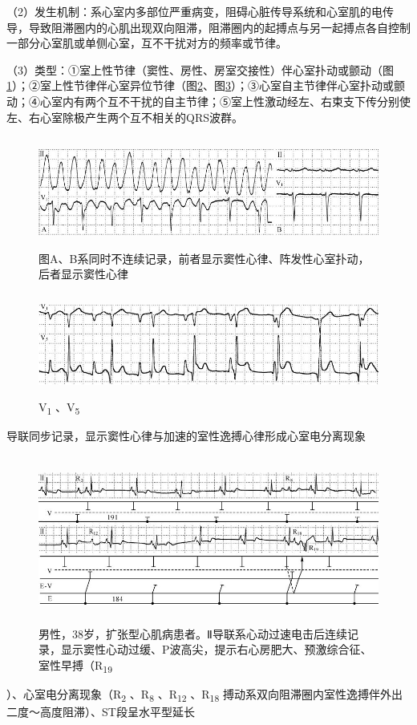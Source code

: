 （2）发生机制：系心室内多部位严重病变，阻碍心脏传导系统和心室肌的电传导，导致阻滞圈内的心肌出现双向阻滞，阻滞圈内的起搏点与另一起搏点各自控制一部分心室肌或单侧心室，互不干扰对方的频率或节律。

（3）类型：①室上性节律（窦性、房性、房室交接性）伴心室扑动或颤动（图\ref{fig30-5}）；②室上性节律伴心室异位节律（图\ref{fig30-6}、图\ref{fig30-7}）；③心室自主节律伴心室扑动或颤动；④心室内有两个互不干扰的自主节律；⑤室上性激动经左、右束支下传分别使左、右心室除极产生两个互不相关的QRS波群。

\begin{figure}[!htbp]
 \centering
 \includegraphics[width=5.60417in,height=1.4375in]{./images/Image00500.jpg}
 \captionsetup{justification=centering}
 \caption{图A、B系同时不连续记录，前者显示窦性心律、阵发性心室扑动，后者显示窦性心律}
 \label{fig30-5}
  \end{figure} 

\begin{figure}[!htbp]
 \centering
 \includegraphics[width=5.59375in,height=1.32292in]{./images/Image00501.jpg}
 \captionsetup{justification=centering}
 \caption{V\textsubscript{1} 、V\textsubscript{5}}
 \label{fig30-6}
  \end{figure} 
导联同步记录，显示窦性心律与加速的室性逸搏心律形成心室电分离现象

\begin{figure}[!htbp]
 \centering
 \includegraphics[width=5.58333in,height=2.17708in]{./images/Image00502.jpg}
 \captionsetup{justification=centering}
 \caption{男性，38岁，扩张型心肌病患者。Ⅱ导联系心动过速电击后连续记录，显示窦性心动过缓、P波高尖，提示右心房肥大、预激综合征、室性早搏（R\textsubscript{19}}
 \label{fig30-7}
  \end{figure} 
）、心室电分离现象（R\textsubscript{2} 、R\textsubscript{8}
、R\textsubscript{12} 、R\textsubscript{18}
搏动系双向阻滞圈内室性逸搏伴外出二度～高度阻滞）、ST段呈水平型延长

